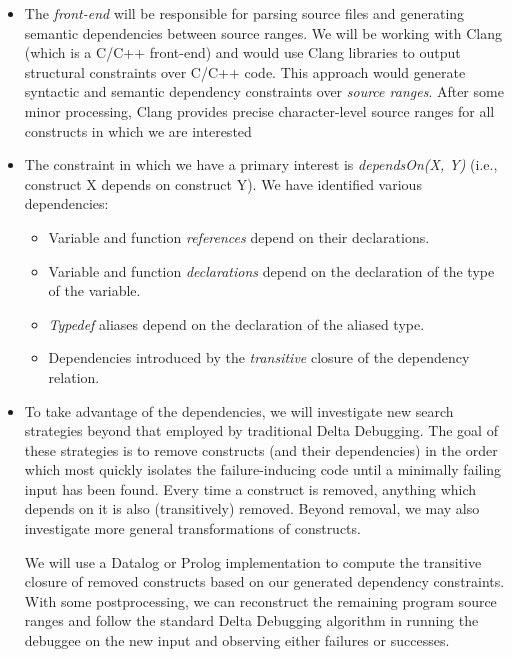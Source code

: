 \documentclass[11pt]{article}
\begin{document}
\begin{itemize}
\item The \emph{front-end} will be responsible for parsing source files and
  generating semantic dependencies between source ranges. We will be working
  with Clang \citep{clang} (which is a C/C++ front-end) and would use Clang libraries to
  output structural constraints over C/C++ code.  This approach would generate
  syntactic and semantic dependency constraints over \emph{source ranges}.  After
  some minor processing, Clang provides precise character-level source ranges for
  all constructs in which we are interested

\item The constraint in which we have a primary interest is \emph{dependsOn(X,
  Y)} (i.e., construct X depends on construct Y).  We have identified various
  dependencies:

\begin{itemize}
\item{Variable and function \emph{references} depend on their declarations.}
\item{Variable and function \emph{declarations} depend on the declaration of the
  type of the variable.}
\item{\emph{Typedef} aliases depend on the declaration of the aliased type.}
\item{Dependencies introduced by the \emph{transitive} closure of the dependency
  relation.
}
\end{itemize}

\item To take advantage of the dependencies, we will investigate new search
  strategies beyond that employed by traditional Delta Debugging.  The goal of
  these strategies is to remove constructs (and their dependencies) in the order
  which most quickly isolates the failure-inducing code until a minimally
  failing input has been found.  Every time a construct is removed, anything
  which depends on it is also (transitively) removed.  Beyond removal, we may
  also investigate more general transformations of constructs.

  We will use a Datalog or Prolog implementation to compute the transitive
  closure of removed constructs based on our generated dependency constraints.
  With some postprocessing, we can reconstruct the remaining program source
  ranges and follow the standard Delta Debugging algorithm in running the
  debuggee on the new input and observing either failures or successes.

\end{itemize}
\end{document}
